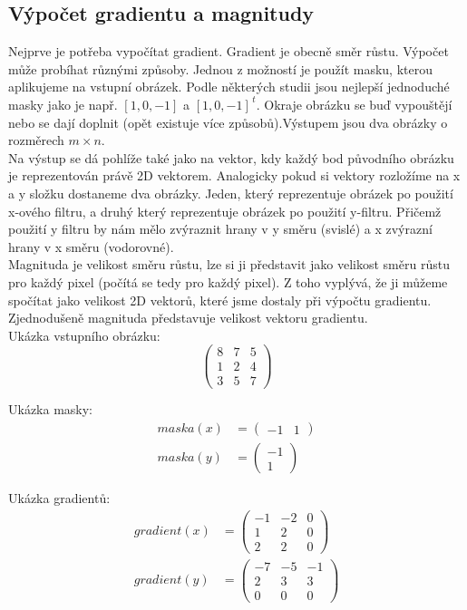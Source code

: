 \documentclass{report}
\begin{document}
\subsection{Výpočet gradientu a magnitudy}
Nejprve je potřeba vypočítat gradient. Gradient je obecně směr růstu. Výpočet může probíhat různými způsoby. Jednou z možností je použít masku, kterou aplikujeme na vstupní obrázek. Podle některých studii jsou nejlepší jednoduché masky jako je např. $[1, 0, -1]$ a $[1, 0, -1]^{\,t}$. Okraje obrázku se buď vypouštějí nebo se dají doplnit (opět existuje více způsobů).Výstupem jsou dva obrázky o rozměrech $m \times n$. \\
Na výstup se dá pohlíže také jako na vektor, kdy každý bod původního obrázku je reprezentován právě 2D vektorem. Analogicky pokud si vektory rozložíme na x a y složku dostaneme dva obrázky. Jeden, který reprezentuje obrázek po použití x-ového filtru, a druhý který reprezentuje obrázek po použití y-filtru. Přičemž použití y filtru by nám mělo zvýraznit hrany v y směru (svislé) a x zvýrazní hrany v x směru (vodorovné). \\
Magnituda je velikost směru růstu, lze si ji představit jako velikost směru růstu pro každý pixel (počítá se tedy pro každý pixel).  Z toho vyplývá, že ji můžeme spočítat jako velikost 2D vektorů, které jsme dostaly při výpočtu gradientu. Zjednodušeně magnituda představuje velikost vektoru gradientu. \\

Ukázka vstupního obrázku: 
\begin{displaymath} 
	\label{vstupni_matice} \begin{pmatrix}8 & 7 & 5 \\1 & 2 & 4 \\3 & 5 & 7 \end{pmatrix}
\end{displaymath}

Ukázka masky: 
\begin{align}
	\label{masky}
		maska(x) &= \begin{pmatrix}-1 & 1 \end{pmatrix} \\
		maska(y) &= \begin{pmatrix}-1 \\ 1 \end{pmatrix}
\end{align}

Ukázka gradientů:
\begin{align}
	\label{vystupni_gradienty}
		gradient(x) &= \begin{pmatrix}-1 & -2 & 0\\1 & 2 & 0 \\2 & 2 & 0 \end{pmatrix} \\
		gradient(y) &= \begin{pmatrix}-7 & -5 & -1 \\2 & 3 & 3 \\0 & 0 & 0 \end{pmatrix}
\end{align}
\end{document}
